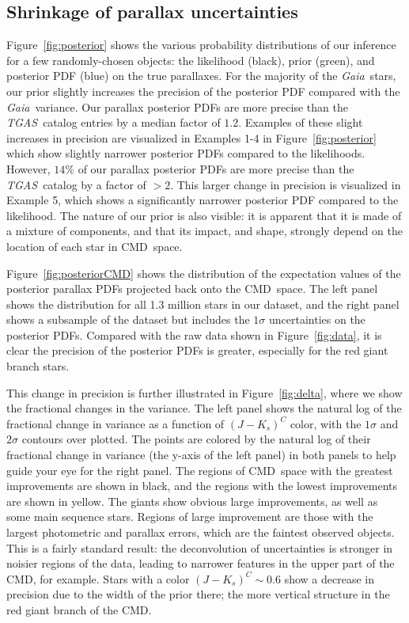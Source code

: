 \documentclass[modern]{aastex61}
\newcommand{\acronym}[1]{{\small{#1}}}
\newcommand{\project}[1]{\textsl{#1}}
\newcommand{\tgas}{\project{\acronym{TGAS}}}
\newcommand{\gaia}{\project{Gaia}}
\newcommand{\cmd}{\acronym{CMD}}
\begin{document}
\subsection{Shrinkage of parallax uncertainties}

Figure~\ref{fig:posterior} shows the various probability distributions of our inference for a few randomly-chosen objects: the likelihood (black), prior (green), and posterior PDF (blue) on the true parallaxes.
For the majority of the \gaia\ stars, our prior slightly increases the precision of the posterior PDF compared with the \gaia\ variance. Our parallax posterior PDFs are more precise than the \tgas\ catalog entries by a median factor of $1.2$. Examples of these slight increases in precision are visualized in Examples 1-4 in Figure~\ref{fig:posterior} which show slightly narrower posterior PDFs compared to the likelihoods.
However, $14\%$ of our parallax posterior PDFs are more precise than the \tgas\ catalog by a factor of $>2$. This larger change in precision is visualized in Example 5, which shows a significantly narrower posterior PDF compared to the likelihood.
The nature of our prior is also visible: it is apparent that it is made of a mixture of components, and that its impact, and shape, strongly depend on the location of each star in \cmd\ space.

Figure~\ref{fig:posteriorCMD} shows the distribution of the expectation values of the posterior parallax PDFs projected back onto the \cmd\ space.
The left panel shows the distribution for all 1.3 million stars in our dataset, and the right panel shows a subsample of the dataset but includes the $1\sigma$ uncertainties on the posterior PDFs.
Compared with the raw data shown in Figure~\ref{fig:data}, it is clear the precision of the posterior PDFs is greater, especially for the red giant branch stars.

This change in precision is further illustrated in Figure~\ref{fig:delta}, where we show the fractional changes in the variance. The left panel shows the natural log of the fractional change in variance as a function of $(J-K_s)^C$ color, with the $1\sigma$ and $2\sigma$ contours over plotted.
The points are colored by the natural log of their fractional change in variance (the y-axis of the left panel) in both panels to help guide your eye for the right panel. The regions of \cmd\ space with the greatest improvements are shown in black, and the regions with the lowest improvements are shown in yellow.
The giants show obvious large improvements, as well as some main sequence stars.
Regions of large improvement are those with the largest photometric and parallax errors, which are the faintest observed objects.
This is a fairly standard result: the deconvolution of uncertainties is stronger in noisier regions of the data, leading to narrower features in the upper part of the \cmd, for example.
Stars with a color $(J-K_s)^C \sim 0.6$ show a decrease in precision due to the width of the prior there; the more vertical structure in the red giant branch of the \cmd.
\end{document}

